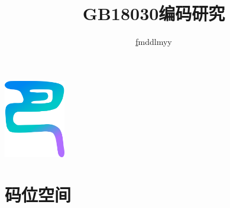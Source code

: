 \documentclass[cn,hazy,blue,14pt,screen]{elegantnote}
\title{GB18030编码研究}
\author{\href{http://www.fmddlmyy.cn/text30.html}fmddlmyy}}
\institute{GBK、GB18030与Unicode的映射}
\date{\zhtoday}
\begin{document}
\maketitle

\centerline{
  \includegraphics[width=0.2\textwidth]{logo.png}
}


\section{码位空间}
\end{document}
